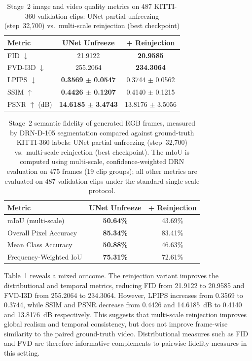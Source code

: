 \begin{table}[t]
    \centering
    \caption{Stage~2 image and video quality metrics on 487 KITTI-360 validation clips: UNet partial unfreezing (step~32,700) vs.\ multi-scale reinjection (best checkpoint)}
    \label{tab:video_metrics}
    \begin{tabular}{lcc}
        \toprule
        \textbf{Metric} & \textbf{UNet Unfreeze} & \textbf{+ Reinjection} \\
        \midrule
        FID $\downarrow$ & 21.9122 & \textbf{20.9585} \\
        FVD-I3D $\downarrow$ & 255.2064 & \textbf{234.3064} \\
        LPIPS $\downarrow$ & \textbf{0.3569 $\pm$ 0.0547} & 0.3744 $\pm$ 0.0562 \\
        SSIM $\uparrow$ & \textbf{0.4426 $\pm$ 0.1207} & 0.4140 $\pm$ 0.1215 \\
        PSNR $\uparrow$ (dB) & \textbf{14.6185 $\pm$ 3.4743} & 13.8176 $\pm$ 3.5056 \\
        \bottomrule
    \end{tabular}
\end{table}

\begin{table}[t]
    \centering
    \caption{Stage~2 semantic fidelity of generated RGB frames, measured by DRN-D-105 segmentation compared against ground-truth KITTI-360 labels: UNet partial unfreezing (step~32,700) vs.\ multi-scale reinjection (best checkpoint). The mIoU is computed using multi-scale, confidence-weighted DRN evaluation on 475 frames (19 clip groups); all other metrics are evaluated on 487 validation clips under the standard single-scale protocol.}
    \label{tab:semantic_fidelity}
    \begin{tabular}{lcc}
        \toprule
        \textbf{Metric} & \textbf{UNet Unfreeze} & \textbf{+ Reinjection} \\
        \midrule
        mIoU (multi-scale)     & \textbf{50.64\%} & 43.69\% \\
        Overall Pixel Accuracy & \textbf{85.34\%} & 83.41\% \\
        Mean Class Accuracy    & \textbf{50.88\%} & 46.63\% \\
        Frequency-Weighted IoU & \textbf{75.31\%} & 72.61\% \\
        \bottomrule
    \end{tabular}
\end{table}

Table~\ref{tab:video_metrics} reveals a mixed outcome. The reinjection variant improves the distributional and temporal metrics, reducing FID from 21.9122 to 20.9585 and FVD-I3D from 255.2064 to 234.3064. However, LPIPS increases from 0.3569 to 0.3744, while SSIM and PSNR decrease from 0.4426 and 14.6185~dB to 0.4140 and 13.8176~dB respectively. This suggests that multi-scale reinjection improves global realism and temporal consistency, but does not improve frame-wise similarity to the paired ground-truth video. Distributional measures such as FID and FVD are therefore informative complements to pairwise fidelity measures in this setting.


